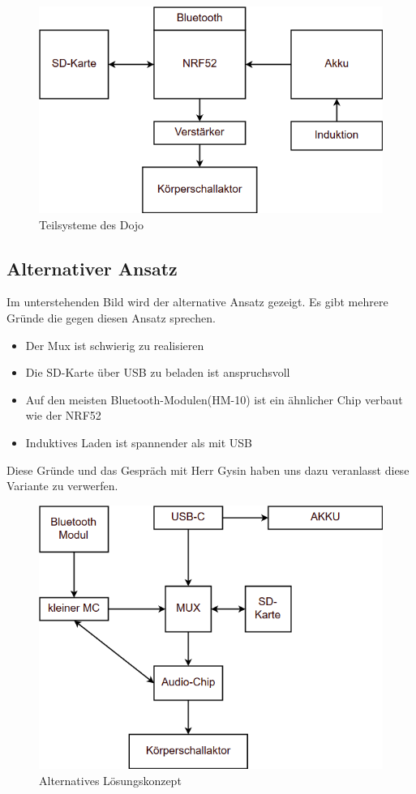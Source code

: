 \begin{figure}[H]
\begin{center}
	\includegraphics[width=120mm]{data/Loesungskonzept_Teilsysteme.png}
	\caption{Teilsysteme des Dojo} %
	\label{fig:first_layer}
\end{center}
\end{figure}


\subsection{Alternativer Ansatz}
Im unterstehenden Bild wird der alternative Ansatz gezeigt. Es gibt mehrere Gründe die gegen diesen Ansatz sprechen.
\begin{itemize}
\item Der Mux ist schwierig zu realisieren
\item Die SD-Karte über USB zu beladen ist anspruchsvoll
\item Auf den meisten Bluetooth-Modulen(HM-10) ist ein ähnlicher Chip verbaut wie der NRF52
\item Induktives Laden ist spannender als mit USB
\end{itemize}
Diese Gründe und das Gespräch mit Herr Gysin haben uns dazu veranlasst diese Variante zu verwerfen.

\begin{figure}[H]
\begin{center}
	\includegraphics[width=120mm]{data/Loesungskonzept_alternativ.png}
	\caption{Alternatives Lösungskonzept} %
	\label{fig:first_layer}
\end{center}
\end{figure}


